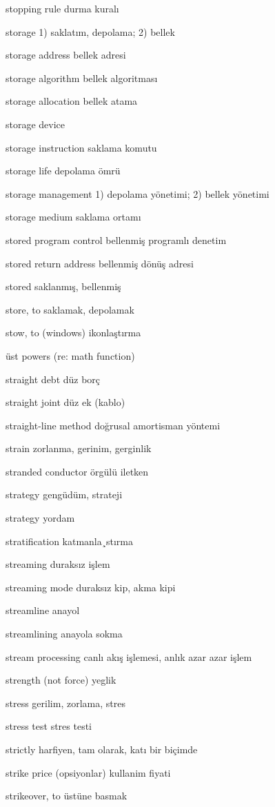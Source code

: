 \documentclass[12pt,fleqn]{article}\usepackage{../../common}
\begin{document}
stopping rule durma kuralı

storage 1) saklatım, depolama; 2) bellek

storage address bellek adresi

storage algorithm bellek algoritması

storage allocation bellek atama

storage device

storage instruction saklama komutu

storage life depolama ömrü

storage management 1) depolama yönetimi; 2) bellek yönetimi

storage medium saklama ortamı

stored program control bellenmiş programlı denetim

stored return address bellenmiş dönüş adresi

stored saklanmış, bellenmiş

store, to saklamak, depolamak

stow, to (windows) ikonlaştırma

üst powers (re: math function)

straight debt düz borç

straight joint düz ek (kablo)

straight-line method doğrusal amortisman yöntemi

strain zorlanma, gerinim, gerginlik

stranded conductor örgülü iletken

strategy gengüdüm, strateji

strategy yordam

stratification katmanla¸stırma

streaming duraksız işlem

streaming mode duraksız kip, akma kipi

streamline anayol

streamlining anayola sokma

stream processing canlı akış işlemesi, anlık azar azar işlem

strength (not force) yeglik

stress gerilim, zorlama, stres

stress test stres testi

strictly harfiyen, tam olarak, katı bir biçimde

strike price (opsiyonlar) kullanim fiyati

strikeover, to üstüne basmak
\end{document}
